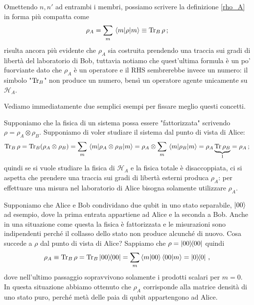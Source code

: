 \noindent Omettendo $n,n'$ ad entrambi i membri, possiamo scrivere la definizione \eqref{rho_A} in forma più compatta come
\begin{equation*}
    \rho_A = \sum_m \expval{\rho}{m} \equiv \Tr_B \rho \, ;
\end{equation*}
risulta ancora più evidente che $\rho_A$ sia costruita prendendo una traccia sui gradi di libertà del laboratorio di Bob, tuttavia notiamo che quest'ultima formula è un po' fuorviante dato che $\rho_A$ è un operatore e il RHS sembrerebbe invece un numero: il simbolo "$\Tr_B$" non produce un numero, bensì un operatore agente unicamente su $\mathcal{H}_A$.

\noindent Vediamo immediatamente due semplici esempi per fissare meglio questi concetti. 
\begin{esempio}
    Supponiamo che la fisica di un sistema possa essere "fattorizzata" scrivendo $\rho = \rho_A \otimes \rho_B$. Supponiamo di voler studiare il sistema dal punto di vista di Alice:
    \begin{equation*}
        \Tr_B \rho = \Tr_B (\rho_A \otimes \rho_B) = \sum_m \expval{\rho_A \otimes \rho_B}{m} = \rho_A \otimes \sum_m \expval{\rho_B}{m} = \rho_A \underbrace{\Tr \rho_B}_1 = \rho_A \, ;
    \end{equation*}
    quindi se si vuole studiare la fisica di $\mathcal{H}_A$ e la fisica totale è disaccoppiata, ci si aspetta che prendere una traccia sui gradi di libertà esterni produca $\rho_A$: per effettuare una misura nel laboratorio di Alice bisogna solamente utilizzare $\rho_A$. 
\end{esempio}

\begin{esempio}
    Supponiamo che Alice e Bob condividano due qubit in uno stato separabile, $\ket{00}$ ad esempio, dove la prima entrata appartiene ad Alice e la seconda a Bob. Anche in una situazione come questa la fisica è fattorizzata e le misurazioni sono indipendenti perché il collasso dello stato non produce alcunché di nuovo. Cosa succede a $\rho$ dal punto di vista di Alice? Sappiamo che $\rho = \ketbra{00}$ quindi
    \begin{equation*}
        \rho_A \equiv \Tr_B \rho = \Tr_B \ketbra{00} = \sum_m \braket{m}{00} \braket{00}{m} = \ketbra{0} \, ,
    \end{equation*}
    dove nell'ultimo passaggio sopravvivono solamente i prodotti scalari per $m=0$. In questa situazione abbiamo ottenuto che $\rho_A$ corrisponde alla matrice densità di uno stato puro, perché metà delle paia di qubit appartengono ad Alice. 
\end{esempio}

